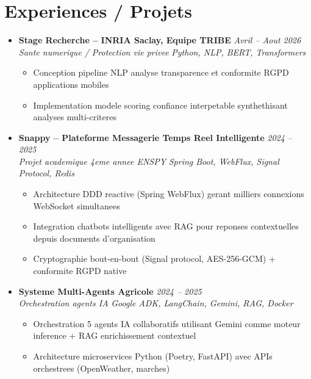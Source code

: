 \documentclass[a4paper,11pt]{article}
\begin{document}
\section{Experiences / Projets}
\begin{itemize}[leftmargin=*, label={-}]

\item \textbf{Stage Recherche -- INRIA Saclay, Equipe TRIBE} \hfill \textit{Avril -- Aout 2026} \\
\textit{Sante numerique / Protection vie privee} \hfill \textit{Python, NLP, BERT, Transformers}
\vspace{-2pt}
    \begin{itemize}[leftmargin=0.4cm, nosep, label=\tiny$\bullet$]
        \item \small{Conception pipeline NLP analyse transparence et conformite RGPD applications mobiles}
        \item \small{Implementation modele scoring confiance interpetable synthethisant analyses multi-criteres}
    \end{itemize}
\vspace{3pt}

\item \textbf{Snappy -- Plateforme Messagerie Temps Reel Intelligente} \hfill \textit{2024 -- 2025} \\
\textit{Projet academique 4eme annee ENSPY} \hfill \textit{Spring Boot, WebFlux, Signal Protocol, Redis}
\vspace{-2pt}
    \begin{itemize}[leftmargin=0.4cm, nosep, label=\tiny$\bullet$]
        \item \small{Architecture DDD reactive (Spring WebFlux) gerant milliers connexions WebSocket simultanees}
        \item \small{Integration chatbots intelligents avec RAG pour reponses contextuelles depuis documents d'organisation}
        \item \small{Cryptographie bout-en-bout (Signal protocol, AES-256-GCM) + conformite RGPD native}
    \end{itemize}
\vspace{3pt}

\item \textbf{Systeme Multi-Agents Agricole} \hfill \textit{2024 -- 2025} \\
\textit{Orchestration agents IA} \hfill \textit{Google ADK, LangChain, Gemini, RAG, Docker}
\vspace{-2pt}
    \begin{itemize}[leftmargin=0.4cm, nosep, label=\tiny$\bullet$]
        \item \small{Orchestration 5 agents IA collaboratifs utilisant Gemini comme moteur inference + RAG enrichissement contextuel}
        \item \small{Architecture microservices Python (Poetry, FastAPI) avec APIs orchestrees (OpenWeather, marches)}
    \end{itemize}
\vspace{3pt}


\end{itemize}
\end{document}
